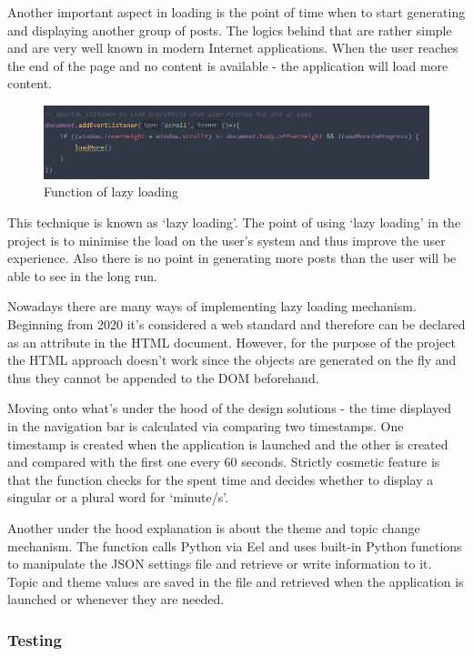 \documentclass[12pt]{report}
\begin{document}
Another important aspect in loading is the point of time when to start generating and displaying another group of posts. The logics behind that are rather simple and are very well known
in modern Internet applications. When the user reaches the end of the page and no content is available - the application will load more content.


\begin{figure}[ht]
  \centering
  \includegraphics[width=.8\linewidth]{img/lazy-loading.png}
  \caption{Function of lazy loading}
  \label{fig:lazy-loading}
\end{figure}

This technique is known as `lazy loading'. The point of using `lazy loading' in the project is to minimise the load on the user's system
and thus improve the user experience. Also there is no point in generating more posts than the user will be able to see in the long run.

Nowadays there are many ways of implementing lazy loading mechanism. Beginning from 2020 it's considered a web standard and therefore
can be declared as an attribute in the HTML document. However, for the purpose of the project the HTML approach doesn't work since the objects
are generated on the fly and thus they cannot be appended to the DOM beforehand.

Moving onto what's under the hood of the design solutions - the time displayed in the navigation bar is calculated via comparing two timestamps.
One timestamp is created when the application is launched and the other is created and compared with the first one every 60 seconds.
Strictly cosmetic feature is that the function checks for the spent time and decides whether to display a singular or a plural word for `minute/s'.

Another under the hood explanation is about the theme and topic change mechanism. The function calls Python via Eel and uses built-in Python
functions to manipulate the JSON settings file and retrieve or write information to it. Topic and theme values are saved in the file and retrieved
when the application is launched or whenever they are needed.

\clearpage

\subsubsection*{Testing}
\end{document}
